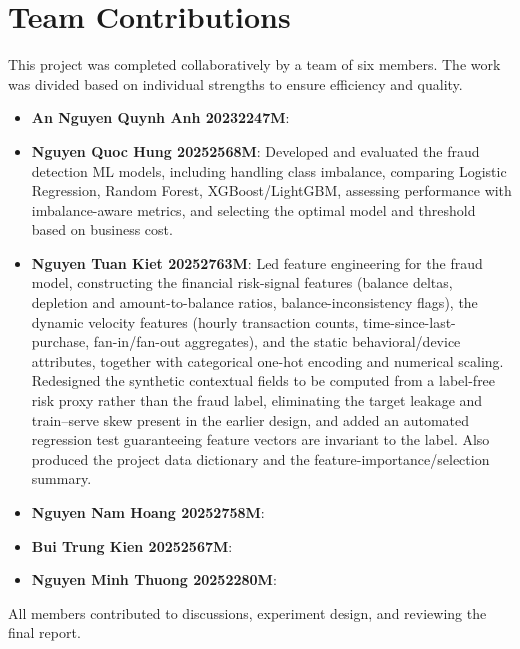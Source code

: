 \section{Team Contributions}

This project was completed collaboratively by a team of six members. The work was divided based on individual strengths to ensure efficiency and quality.

\begin{itemize}
  \item \textbf{An Nguyen Quynh Anh 20232247M}:

  \item \textbf{Nguyen Quoc Hung 20252568M}: Developed and evaluated the fraud detection ML models, including handling class imbalance, comparing Logistic Regression, Random Forest, XGBoost/LightGBM, assessing performance with imbalance-aware metrics, and selecting the optimal model and threshold based on business cost.

  \item \textbf{Nguyen Tuan Kiet 20252763M}: Led feature engineering for the fraud model, constructing the financial risk-signal features (balance deltas, depletion and amount-to-balance ratios, balance-inconsistency flags), the dynamic velocity features (hourly transaction counts, time-since-last-purchase, fan-in/fan-out aggregates), and the static behavioral/device attributes, together with categorical one-hot encoding and numerical scaling. Redesigned the synthetic contextual fields to be computed from a label-free risk proxy rather than the fraud label, eliminating the target leakage and train--serve skew present in the earlier design, and added an automated regression test guaranteeing feature vectors are invariant to the label. Also produced the project data dictionary and the feature-importance/selection summary.

  \item \textbf{Nguyen Nam Hoang 20252758M}:

  \item \textbf{Bui Trung Kien 20252567M}:

  \item \textbf{Nguyen Minh Thuong 20252280M}:
\end{itemize}

All members contributed to discussions, experiment design, and reviewing the final report.
